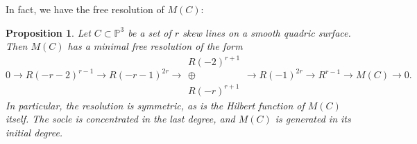 \documentclass[12pt]{amsart}%
\numberwithin{equation}{section}
\newtheorem{proposition}[theorem]{Proposition}
\theoremstyle{definition}
\numberwithin{equation}{section}
\newcommand{\PP}{ \ensuremath{\mathbb{P}}}
\begin{document}
In fact, we have the free resolution of $M(C)$:

\begin{proposition}
    Let $C \subset \PP^3$ be a set of $r$ skew lines on a smooth quadric surface. Then $M(C)$ has a minimal free resolution of the form
    \[
0 \rightarrow R(-r-2)^{r-1} \rightarrow R(-r-1)^{2r} \rightarrow 
\begin{array}{c}
R(-2)^{r+1} \\
\oplus \\
R(-r)^{r+1}
\end{array}
\rightarrow R(-1)^{2r} \rightarrow R^{r-1} \rightarrow M(C) \rightarrow 0.
    \]
    In particular, the resolution is symmetric,  as is the Hilbert function of $M(C)$ itself. The socle is concentrated in the last degree, and $M(C)$ is generated in its initial degree.
\end{proposition}
\end{document}
